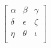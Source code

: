 \documentclass[12pt]{article}
\begin{document}
$$
\left[
\begin{array}{rcl}
\alpha&\beta&\gamma\\
\delta&\epsilon&\zeta\\
\eta&\theta&\iota\\
\end{array}
\right]
$$
\end{document}
